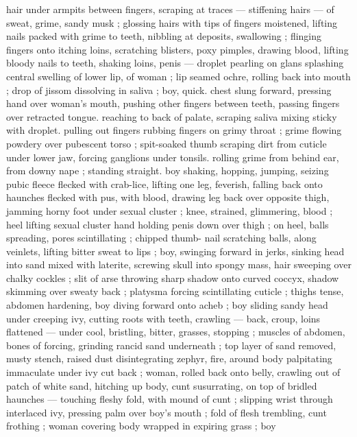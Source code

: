 hair under armpits between fingers, scraping at traces --- stiffening 
hairs --- of sweat, grime, sandy musk ; glossing hairs with tips of 
fingers moistened, lifting nails packed with grime to teeth, nibbling 
at deposits, swallowing ; flinging fingers onto itching loins, 
scratching blisters, poxy pimples, drawing blood, lifting bloody nails 
to teeth, shaking loins, penis --- droplet pearling on glans splashing 
central swelling of lower lip, of woman ; lip seamed ochre, rolling 
back into mouth ; drop of jissom dissolving in saliva ; boy, quick. 
chest slung forward, pressing hand over woman's mouth, pushing 
other fingers between teeth, passing fingers over retracted tongue. 
reaching to back of palate, scraping saliva mixing sticky with droplet. 
pulling out fingers rubbing fingers on grimy throat ; grime flowing 
powdery over pubescent torso ; spit-soaked thumb scraping dirt 
from  cuticle under lower jaw, forcing ganglions under tonsils. 
rolling grime from behind ear, from downy nape ; standing straight. 
boy shaking, hopping, jumping, seizing pubic fleece flecked with 
crab-lice, lifting one leg, feverish, falling back onto haunches flecked 
with pus, with blood, drawing leg back over opposite thigh, jamming 
horny foot under sexual cluster ; knee, strained, glimmering, blood 
 ; heel lifting sexual cluster {\col} hand holding penis down over 
thigh ; on heel, balls spreading, pores scintillating ; chipped thumb- 
nail scratching balls, along veinlets, lifting bitter sweat to lips ; boy, 
swinging forward in jerks, sinking head into sand mixed with laterite, 
screwing skull into spongy mass, hair sweeping over chalky cockles 
; slit of arse throwing sharp shadow onto curved coccyx, shadow 
skimming over sweaty back ; platysma forcing scintillating cuticle ; 
thighs tense, abdomen hardening, boy diving forward onto acheb ; 
boy sliding sandy head under creeping ivy, cutting roots with teeth, 
crawling --- back, croup, loins flattened --- under cool, bristling, 
bitter, grasses, stopping ; muscles of abdomen, bones of 
 forcing, grinding rancid sand underneath ; top layer of 
sand removed, musty stench, raised dust disintegrating zephyr, fire, 
around body palpitating immaculate under ivy cut back ; woman, 
rolled back onto belly, crawling out of patch of white sand, hitching 
up body, cunt susurrating, on top of bridled haunches --- touching 
fleshy fold, with mound of cunt ; slipping wrist through interlaced ivy, 
pressing palm over boy's mouth ; fold of flesh trembling, cunt 
frothing ; woman covering body wrapped in expiring grass ; boy 
